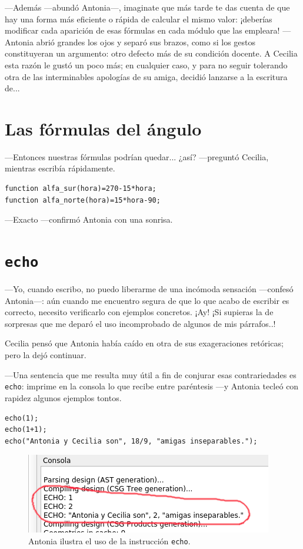 ---Además ---abundó Antonia---, imaginate que más tarde te das cuenta
de que hay una forma más eficiente o rápida de calcular el mismo
valor: ¡deberías modificar cada aparición de esas fórmulas en cada
módulo que las empleara!  ---Antonia abrió grandes los ojos y separó
sus brazos, como si los gestos constituyeran un argumento: otro
defecto más de su condición docente. A Cecilia esta razón le gustó un
poco más; en cualquier caso, y para no seguir tolerando otra de las
interminables apologías de su amiga, decidió lanzarse a la escritura
de...

\section{Las fórmulas del ángulo}

---Entonces nuestras fórmulas podrían quedar... ¿así?  ---pre\-gun\-tó
Cecilia, mientras escribía rápidamente.

\begin{lstlisting}
function alfa_sur(hora)=270-15*hora; 
function alfa_norte(hora)=15*hora-90;
\end{lstlisting}

---Exacto ---confirmó Antonia con una sonrisa.

\section[echo]{\lstinline!echo!}

---Yo, cuando escribo, no puedo liberarme de una incómoda sensación
---con\-fe\-só Antonia---: aún cuando me encuentro segura de que lo
que acabo de escribir es correcto, necesito verificarlo con ejemplos
concretos. ¡Ay! ¡Si supieras la de sorpresas que me deparó el uso
incomprobado de algunos de mis párrafos..!

Cecilia pensó que Antonia había caído en otra de sus exageraciones
retóricas; pero la dejó continuar.

---Una sentencia que me resulta muy útil a fin de conjurar esas
contrariedades es \lstinline!echo!: imprime en la consola lo que
recibe entre paréntesis ---y Antonia tecleó con rapidez algunos
ejemplos tontos.

\begin{lstlisting}
echo(1);
echo(1+1);
echo("Antonia y Cecilia son", 18/9, "amigas inseparables.");
\end{lstlisting}


\begin{figure}[ht]
  \centering
  \includegraphics[width=.8\textwidth]{imagenes/consola-echo-1}  
  \caption{Antonia ilustra el uso de la instrucción \lstinline!echo!.}
  \label{fig:consola-echo-1}
\end{figure}



